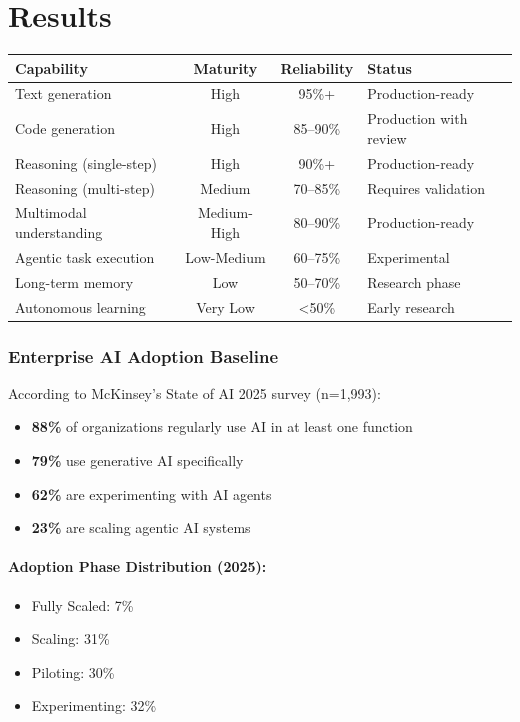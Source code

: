\section{Results}

\begin{tcolorbox}[colback=orange!5!white, colframe=orange!75!black,
    title=\textbf{Key Results: Capability Maturity 2025}]

\begin{tabular}{@{}p{4cm}ccp{4cm}@{}}
\textbf{Capability} & \textbf{Maturity} & \textbf{Reliability} & \textbf{Status} \\
\hline
Text generation & High & 95\%+ & Production-ready \\
Code generation & High & 85--90\% & Production with review \\
Reasoning (single-step) & High & 90\%+ & Production-ready \\
Reasoning (multi-step) & Medium & 70--85\% & Requires validation \\
Multimodal understanding & Medium-High & 80--90\% & Production-ready \\
Agentic task execution & Low-Medium & 60--75\% & Experimental \\
Long-term memory & Low & 50--70\% & Research phase \\
Autonomous learning & Very Low & <50\% & Early research \\
\end{tabular}

\end{tcolorbox}

\subsubsection{Enterprise AI Adoption Baseline}

According to McKinsey's State of AI 2025 survey (n=1,993):

\begin{itemize}
    \item \textbf{88\%} of organizations regularly use AI in at least one function
    \item \textbf{79\%} use generative AI specifically
    \item \textbf{62\%} are experimenting with AI agents
    \item \textbf{23\%} are scaling agentic AI systems
\end{itemize}

\paragraph{Adoption Phase Distribution (2025):}
\begin{itemize}
    \item Fully Scaled: 7\%
    \item Scaling: 31\%
    \item Piloting: 30\%
    \item Experimenting: 32\%
\end{itemize}

